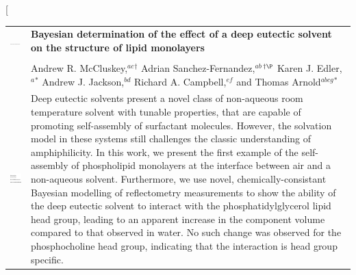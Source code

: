 \documentclass[twoside,twocolumn,9pt]{article}
\begin{document}
\twocolumn[
  \begin{@twocolumnfalse}
\vspace{3cm}
\sffamily
\begin{tabular}{m{4.5cm} p{13.5cm} }

\includegraphics{head_foot/DOI} & \noindent\LARGE{\textbf{Bayesian determination of the effect of a deep eutectic solvent on the structure of lipid monolayers}} \\%
\vspace{0.3cm} & \vspace{0.3cm} \\

 & \noindent\large{Andrew R. McCluskey,\textit{$^{ac}$}$^{\dag}$ Adrian Sanchez-Fernandez,\textit{$^{ab}$}$^{\dag\P}$ Karen J. Edler,\textit{$^{a}$}$^{\ast}$ Andrew J. Jackson,\textit{$^{bd}$} Richard A. Campbell,\textit{$^{ef}$} and Thomas Arnold\textit{$^{abcg}$}$^{\ast}$} \\%

\includegraphics{head_foot/dates} & \noindent\normalsize{Deep eutectic solvents present a novel class of non-aqueous room temperature solvent with tunable properties, that are capable of promoting self-assembly of surfactant molecules. However, the solvation model in these systems still challenges the classic understanding of amphiphilicity. In this work, we present the first example of the self-assembly of phospholipid monolayers at the interface between air and a non-aqueous solvent. Furthermore, we use novel, chemically-consistant Bayesian modelling of reflectometry measurements to show the ability of the deep eutectic solvent to interact with the phosphatidylglycerol lipid head group, leading to an apparent increase in the component volume compared to that observed in water. No such change was observed for the phosphocholine head group, indicating that the interaction is head group specific.} \\

\end{tabular}

	\end{@twocolumnfalse} \vspace{0.6cm}
\end{document}
